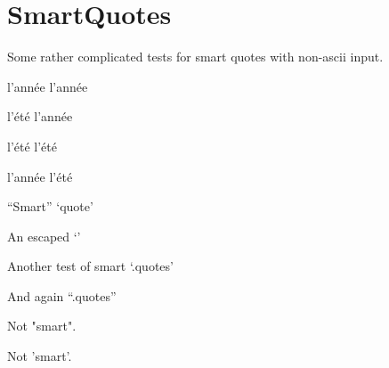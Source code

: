 
\def\mytitle{SmartQuotes Test}


\part{SmartQuotes}
\label{smartquotes}

Some rather complicated tests for smart quotes with non-{}ascii input.

l'année l'année

l'été l'année

l'été l'été

l'année l'été

``Smart'' `quote'

An escaped `\textbar{}'

Another test of smart `.quotes'

And again ``.quotes''

Not "smart".

Not 'smart'.





